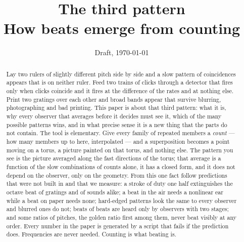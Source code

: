 \documentclass[10pt]{article}
\title{The third pattern\\[0.3em]\large How beats emerge from counting}
\author{}
\date{Draft, \today}
\theoremstyle{plain}
\theoremstyle{definition}
\begin{document}
\maketitle

\begin{abstract}
Lay two rulers of slightly different pitch side by side and a slow pattern
of coincidences appears that is on neither ruler. Feed two trains of clicks
through a detector that fires only when clicks coincide and it fires at the
difference of the rates and at nothing else. Print two gratings over each
other and broad bands appear that survive blurring, photographing and bad
printing. This paper is about that third pattern: what it is, why every
observer that averages before it decides must see it, which of the many
possible patterns wins, and in what precise sense it is a new thing that
the parts do not contain. The tool is elementary. Give every family of
repeated members a \emph{count} --- how many members up to here,
interpolated --- and a superposition becomes a point moving on a torus, a
picture painted on that torus, and nothing else. The pattern you see is the
picture averaged along the fast directions of the torus; that average is a
function of the slow combinations of counts alone, it has a closed form,
and it does not depend on the observer, only on the geometry. From this one
fact follow predictions that were not built in and that we measure: a
stroke of duty one half extinguishes the octave beat of gratings and of
sounds alike; a beat in the air needs a nonlinear ear while a beat on paper
needs none; hard-edged patterns look the same to every observer and blurred
ones do not; beats of beats are heard only by observers with two stages;
and some ratios of pitches, the golden ratio first among them, never beat
visibly at any order. Every number in the paper is generated by a script
that fails if the prediction does. Frequencies are never needed. Counting
is what beating is.
\end{abstract}













\end{document}

